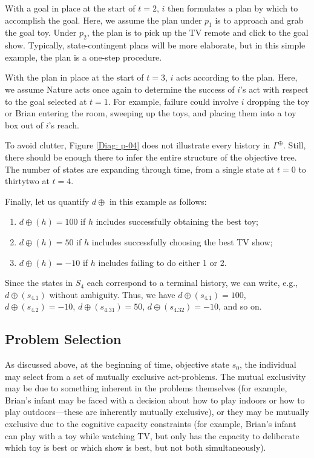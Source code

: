 \documentclass[
11pt,
titlepage,
reqno,
]{article}%
\theoremstyle{definition}
\begin{document}
With a goal in place at the start of $t=2$, $i$ then formulates a plan by which to accomplish the goal. 
Here, we assume the plan under $p_1$ is to approach and grab the goal toy. 
Under  $p_2$, the plan is to pick up the TV remote and click to the goal show.
Typically, state-contingent plans will be more elaborate, but in this simple example, the plan is a one-step procedure.

With the plan in place at the start of $t=3$, $i$ acts according to the plan.
Here, we assume Nature acts once again to determine the success of $i$'s act with respect to the goal selected at $t=1$.
For example, failure could involve $i$ dropping the toy or Brian entering the room, sweeping up the toys, and placing them into a toy box out of $i$'s reach.

To avoid clutter, Figure \ref{Diag: p-04} does not illustrate every history in $\Gamma^\oplus$.
Still, there should be enough there to infer the entire structure of the objective tree.
The number of states are expanding through time, from a single state at $t=0$ to thirtytwo at $t=4$.

Finally, let us quantify $d\oplus$ in this example as follows:
\begin{enumerate}
	\item $d\oplus(h)=100$ if $h$ includes successfully obtaining the best toy;
	\item $d\oplus(h)=50$ if $h$ includes successfully choosing the best TV show;
	\item $d\oplus(h)=-10$ if $h$ includes failing to do either 1 or 2.
\end{enumerate}
Since the states in $S_4$ each correspond to a terminal history, we can write, e.g., $d\oplus(s_{4.1})$ without ambiguity.
Thus, we have $d\oplus(s_{4.1})=100$, $d\oplus(s_{4.2})=-10$, $d\oplus(s_{4.31})=50$, $d\oplus(s_{4.32})=-10$, and so on.


\subsection{Problem Selection}

As discussed above, at the beginning of time, objective state $s_0$, the individual may select from a set of mutually exclusive act-problems. 
The mutual exclusivity may be due to something inherent in the problems themselves (for example, Brian's infant may be faced with a decision about how to play indoors or how to play outdoors---these are inherently mutually exclusive), or they may be mutually exclusive due to the cognitive capacity constraints (for example, Brian's infant can play with a toy while watching TV, but only has the capacity to deliberate which toy is best or which show is best, but not both simultaneously).
\end{document}
